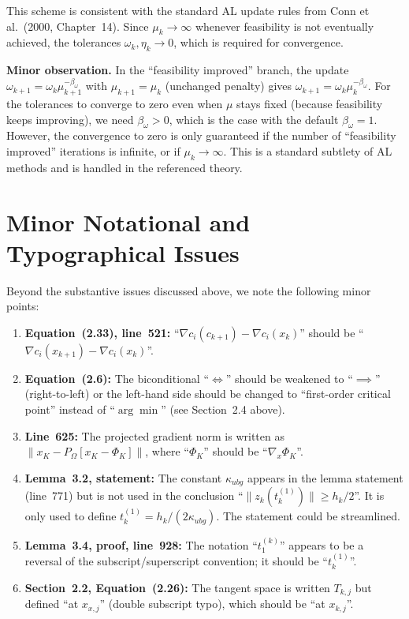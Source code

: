 \documentclass[11pt]{article}
\newcommand{\proj}[2]{P_{#1}\!\left[#2\right]}
\theoremstyle{plain}
\begin{document}
This scheme is consistent with the standard AL update rules from Conn et al.\ (2000, Chapter~14). Since $\mu_k \to \infty$ whenever feasibility is not eventually achieved, the tolerances $\omega_k,\eta_k \to 0$, which is required for convergence.

\medskip\noindent
\textcolor{warncolor}{\textbf{Minor observation.}} In the ``feasibility improved'' branch, the update $\omega_{k+1} = \omega_k\mu_{k+1}^{-\beta_\omega}$ with $\mu_{k+1} = \mu_k$ (unchanged penalty) gives $\omega_{k+1} = \omega_k\mu_k^{-\beta_\omega}$. For the tolerances to converge to zero even when $\mu$ stays fixed (because feasibility keeps improving), we need $\beta_\omega > 0$, which is the case with the default $\beta_\omega = 1$. However, the convergence to zero is only guaranteed if the number of ``feasibility improved'' iterations is infinite, or if $\mu_k\to\infty$. This is a standard subtlety of AL methods and is handled in the referenced theory.


\section{Minor Notational and Typographical Issues}\label{sec:typos}

Beyond the substantive issues discussed above, we note the following minor points:

\begin{enumerate}[label=\arabic*.]
  \item \textbf{Equation~(2.33), line~521:} ``$\nabla c_i(c_{k+1}) - \nabla c_i(x_k)$'' should be ``$\nabla c_i(x_{k+1}) - \nabla c_i(x_k)$''.
  
  \item \textbf{Equation~(2.6):} The biconditional ``$\iff$'' should be weakened to ``$\implies$'' (right-to-left) or the left-hand side should be changed to ``first-order critical point'' instead of ``$\arg\min$'' (see Section~2.4 above).
  
  \item \textbf{Line~625:} The projected gradient norm is written as $\|x_K - \proj{\Omega}{x_K - \Phi_K}\|$, where ``$\Phi_K$'' should be ``$\nabla_x\Phi_K$''.

  \item \textbf{Lemma~3.2, statement:} The constant $\kappa_{ubg}$ appears in the lemma statement (line~771) but is not used in the conclusion ``$\|z_k(t_k^{(1)})\| \ge h_k/2$''. It is only used to define $t_k^{(1)} = h_k/(2\kappa_{ubg})$. The statement could be streamlined.
  
  \item \textbf{Lemma~3.4, proof, line~928:} The notation ``$t_1^{(k)}$'' appears to be a reversal of the subscript/superscript convention; it should be ``$t_k^{(1)}$''.

  \item \textbf{Section~2.2, Equation~(2.26):} The tangent space is written $T_{k,j}$ but defined ``at $x_{x,j}$'' (double subscript typo), which should be ``at $x_{k,j}$''.
\end{enumerate}
\end{document}
